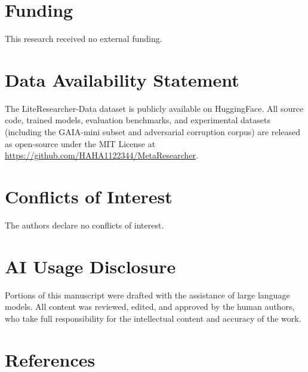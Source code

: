 \documentclass[notspecified,article,accept,pdftex,moreauthors]{Definitions/mdpi}
\begin{document}
\section*{Funding}
This research received no external funding.

\section*{Data Availability Statement}
The LiteResearcher-Data dataset is publicly available on HuggingFace. All source code, trained models, evaluation benchmarks, and experimental datasets (including the GAIA-mini subset and adversarial corruption corpus) are released as open-source under the MIT License at \url{https://github.com/HAHA1122344/MetaResearcher}.

\section*{Conflicts of Interest}
The authors declare no conflicts of interest.

\section*{AI Usage Disclosure}
Portions of this manuscript were drafted with the assistance of large language models. All content was reviewed, edited, and approved by the human authors, who take full responsibility for the intellectual content and accuracy of the work.

\section{References}
\label{sec:references}

\end{document}

